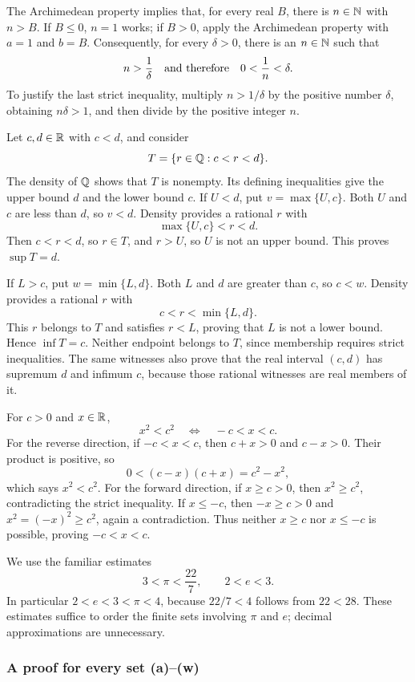 The Archimedean property implies that, for every real $B$, there is
$n\in\mathbb{N}$ with $n>B$. If $B\leq0$, $n=1$ works; if $B>0$, apply
the Archimedean property with $a=1$ and $b=B$.
Consequently, for every $\delta>0$, there is an $n\in\mathbb{N}$ such that
\[
 n>\frac1\delta
 \quad\hbox{and therefore}\quad
 0<\frac1n<\delta.
\]
To justify the last strict inequality, multiply $n>1/\delta$ by
the positive number $\delta$, obtaining $n\delta>1$, and then
divide by the positive integer $n$.

Let $c,d\in\mathbb{R}$ with $c<d$, and consider
\[
 T=\{r\in\mathbb{Q}:c<r<d\}.
\]
The density of $\mathbb{Q}$ shows that $T$ is nonempty. Its defining
inequalities give the upper bound $d$ and the lower bound $c$.
If $U<d$, put $v=\max\{U,c\}$. Both $U$ and $c$ are less than
$d$, so $v<d$. Density provides a rational $r$ with
\[
 \max\{U,c\}<r<d.
\]
Then $c<r<d$, so $r\in T$, and $r>U$, so $U$ is not an upper
bound. This proves $\sup T=d$.

If $L>c$, put $w=\min\{L,d\}$. Both $L$ and $d$ are greater than
$c$, so $c<w$. Density provides a rational $r$ with
\[
 c<r<\min\{L,d\}.
\]
This $r$ belongs to $T$ and satisfies $r<L$, proving that $L$ is
not a lower bound. Hence $\inf T=c$. Neither endpoint belongs to
$T$, since membership requires strict inequalities. The same witnesses
also prove that the real interval $(c,d)$ has supremum $d$ and
infimum $c$, because those rational witnesses are real members of it.

For $c>0$ and $x\in\mathbb{R}$,
\[
 x^2<c^2\quad\Longleftrightarrow\quad -c<x<c.
\]
For the reverse direction, if $-c<x<c$, then $c+x>0$ and
$c-x>0$. Their product is positive, so
\[
 0<(c-x)(c+x)=c^2-x^2,
\]
which says $x^2<c^2$. For the forward direction, if $x\geq c>0$,
then $x^2\geq c^2$, contradicting the strict inequality. If
$x\leq-c$, then $-x\geq c>0$ and
$x^2=(-x)^2\geq c^2$, again a contradiction. Thus neither
$x\geq c$ nor $x\leq-c$ is possible, proving $-c<x<c$.

We use the familiar estimates
\[
 3<\pi<\frac{22}{7},\qquad 2<e<3.
\]
In particular $2<e<3<\pi<4$, because $22/7<4$ follows from
$22<28$. These estimates suffice to order the finite sets involving
$\pi$ and $e$; decimal approximations are unnecessary.

\subsubsection*{A proof for every set (a)--(w)}

